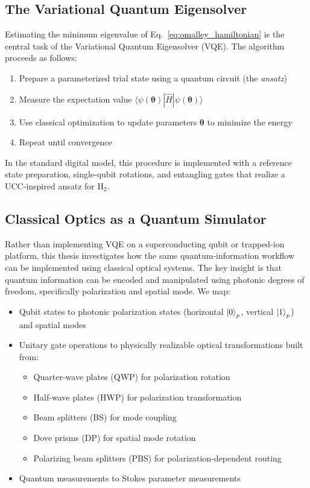 \documentclass[
	a4paper,
	12pt,
	oneside,
]{article}
\begin{document}
\subsection{The Variational Quantum Eigensolver}

Estimating the minimum eigenvalue of Eq.~\ref{eq:omalley_hamiltonian} is the central task of the Variational Quantum Eigensolver (VQE). The algorithm proceeds as follows:
\begin{enumerate}
	\item Prepare a parameterized trial state using a quantum circuit (the \textit{ansatz})
	\item Measure the expectation value $\langle \psi(\boldsymbol{\theta}) | \hat{H} | \psi(\boldsymbol{\theta}) \rangle$
	\item Use classical optimization to update parameters $\boldsymbol{\theta}$ to minimize the energy
	\item Repeat until convergence
\end{enumerate}

In the standard digital model, this procedure is implemented with a reference state preparation, single-qubit rotations, and entangling gates that realize a UCC-inspired ansatz for H$_2$.

\subsection{Classical Optics as a Quantum Simulator}

Rather than implementing VQE on a superconducting qubit or trapped-ion platform, this thesis investigates how the same quantum-information workflow can be implemented using classical optical systems. The key insight is that quantum information can be encoded and manipulated using photonic degrees of freedom, specifically polarization and spatial mode. We map:
\begin{itemize}
	\item Qubit states to photonic polarization states (horizontal $\ket{0}_p$, vertical $\ket{1}_p$) and spatial modes
	\item Unitary gate operations to physically realizable optical transformations built from:
	\begin{itemize}
		\item Quarter-wave plates (QWP) for polarization rotation
		\item Half-wave plates (HWP) for polarization transformation
		\item Beam splitters (BS) for mode coupling
		\item Dove prisms (DP) for spatial mode rotation
		\item Polarizing beam splitters (PBS) for polarization-dependent routing
	\end{itemize}
	\item Quantum measurements to Stokes parameter measurements
\end{itemize}
\end{document}
